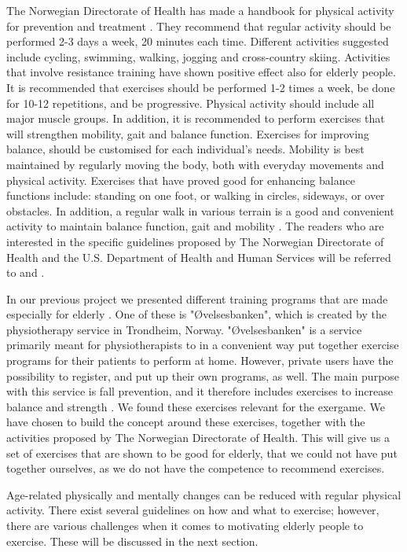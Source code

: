 The Norwegian Directorate of Health has made a handbook for physical activity for prevention and treatment \cite{aktivitetsbok}. They recommend that regular activity should be performed 2-3 days a week, 20 minutes each time. Different activities suggested include cycling, swimming, walking, jogging and cross-country skiing. Activities that involve resistance training have shown positive effect also for elderly people. It is recommended that exercises should be performed 1-2 times a week, be done for 10-12 repetitions, and be progressive. Physical activity should include all major muscle groups. In addition, it is recommended to perform exercises that will strengthen mobility, gait and balance function. Exercises for improving balance, should be customised for each individual's needs. Mobility is best maintained by regularly moving the body, both with everyday movements and physical activity. Exercises that have proved good for enhancing balance functions include: standing on one foot, or walking in circles, sideways, or over obstacles. In addition, a regular walk in various terrain is a good and convenient activity to maintain balance function, gait and mobility \cite{aktivitetsbok}. The readers who are interested in the specific guidelines proposed by The Norwegian Directorate of Health and the U.S. Department of Health and Human Services will be referred to  \cite{aktivitetsbok} and \cite{guidelines}. 

In our previous project we presented different training programs that are made especially for elderly \cite{project}. One of these is "Øvelsesbanken", which is created by the physiotherapy service in Trondheim, Norway.  "Øvelsesbanken" is a service primarily meant for physiotherapists to in a convenient way put together exercise programs for their patients to perform at home. However, private users have the possibility to register, and put up their own programs, as well. The main purpose with this service is fall prevention, and it therefore includes exercises to increase balance and strength \cite{eldretrening}. We found these exercises relevant for the exergame. We have chosen to build the concept around these exercises, together with the activities proposed by The Norwegian Directorate of Health. This will give us a set of exercises that are shown to be good for elderly, that we could not have put together ourselves, as we do not have the competence to recommend exercises.

Age-related physically and mentally changes can be reduced with regular physical activity. There exist several guidelines on how and what to exercise; however, there are various challenges when it comes to motivating elderly people to exercise. These will be discussed in the next section. 

